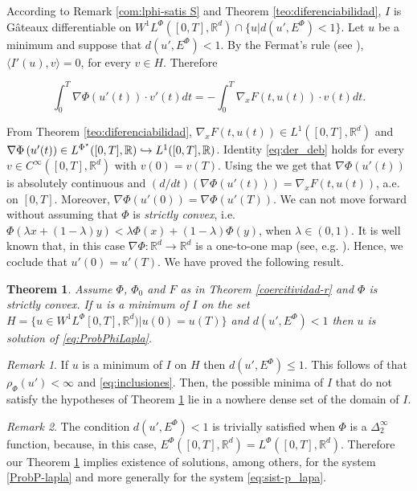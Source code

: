 \documentclass[twoside]{article}
\newtheorem{thm}{Theorem}[section]
\theoremstyle{remark}
\newtheorem{comentario}{Remark}
\newcommand{\lphi}{L^{\Phi}}
\newcommand{\lpsi}{L^{\Phi^{\star}}}
\newcommand{\ephi}{E^{\Phi}}
\newcommand{\wphi}{W^{1}\lphi}
\newcommand{\rr}{\mathbb{R}}
\renewcommand{\leq}{\leqslant}
\begin{document}
According to Remark \ref{com:lphi-satis S} and Theorem \ref{teo:diferenciabilidad}, $I$ is G\^ateaux differentiable on $\wphi([0,T],\rr^d)\cap\{u| d(u',\ephi)<1\}$. Let $u$ be a minimum and suppose that  $d(u',\ephi)<1$. By the Fermat's rule (see \cite[Prop. 4.12]{clarke2013functional}), $\langle I'(u),v\rangle=0$, for every $v\in H$. Therefore

\begin{equation}\label{eq:der_deb}\int_0^T\nabla\Phi(u'(t))\cdot v'(t)dt=-\int_0^T \nabla_xF(t,u(t))\cdot v(t)dt.\end{equation}

From Theorem \ref{teo:diferenciabilidad}, $\nabla_xF(t,u(t))\in L^1([0,T],\rr^d)$ and  $\nabla\Phi\left(u'(t)\right)\in\linebreak\lpsi([0,T],\rr)\hookrightarrow L^1([0,T],\rr)$.  Identity \eqref{eq:der_deb} holds for every $v\in C^{\infty} ([0,T],\rr^d)$ with $v(0)=v(T)$. Using the \cite[Fundamental Lemma, p. 6]{mawhin2010critical} we get that $\nabla\Phi(u'(t))$ is absolutely continuous and $(d/dt)\left(\nabla\Phi(u'(t))\right) = \nabla_xF(t,u(t))$, a.e. on $[0,T]$. Moreover, $\nabla\Phi(u'(0))=\nabla\Phi(u'(T))$. We can not move forward without assuming that $\Phi$ is \emph{strictly convex}, i.e. $\Phi(\lambda x+(1-\lambda)y)<
\lambda \Phi(x)+(1-\lambda)\Phi(y)$, when $\lambda\in (0,1)$. 
It is  well known that, in this case $\nabla\Phi:\mathbb{R}^d\to\mathbb{R}^d$ is a one-to-one map  (see, e.g. \cite[Ex. 4.17, p. 67]{clarke2013functional}). Hence, we coclude that $u'(0)=u'(T)$.  We have proved the following result.

\begin{thm}\label{th:tor_prin} Assume $\Phi$, $\Phi_0$ and $F$ as in Theorem \ref{coercitividad-r} and $\Phi$ is strictly convex. If $u$ is a minimum of $I$ on the set $H=\{u\in\wphi[0,T],\rr^d)| u(0)=u(T)\}$ and $d(u',\ephi)<1$ then $u$ is solution of \eqref{eq:ProbPhiLapla}. 
\end{thm}

\begin{comentario} If $u$ is a minimum of $I$ on $H$ then  $d(u',\ephi)\leq 1$. This follows of  that $\rho_{\Phi}(u')<\infty$ and \eqref{eq:inclusiones}. Then, the possible minima of $I$ that do not satisfy the hypotheses of  Theorem \ref{th:tor_prin} lie in a nowhere dense set of the domain of $I$.
 
\end{comentario}

\begin{comentario} The condition $d(u',\ephi)< 1$ is trivially satisfied when $\Phi$ is a $\Delta_2^{\infty}$ function, because, in this case, $\ephi([0,T],\rr^d)=\lphi([0,T],\rr^d)$. Therefore our Theorem \ref{th:tor_prin} implies existence of solutions, among others, for the system  \eqref{ProbP-lapla} and more generally for the system \eqref{eq:sist-p_lapa}. 
\end{comentario}
\end{document}
